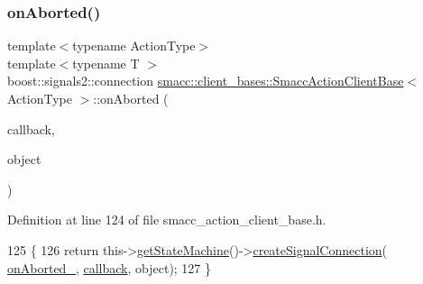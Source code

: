 \subsubsection{\texorpdfstring{on\+Aborted()}{onAborted()}\hspace{0.1cm}{\footnotesize\ttfamily [1/2]}}
{\footnotesize\ttfamily template$<$typename Action\+Type$>$ \\
template$<$typename T $>$ \\
boost\+::signals2\+::connection \hyperlink{classsmacc_1_1client__bases_1_1SmaccActionClientBase}{smacc\+::client\+\_\+bases\+::\+Smacc\+Action\+Client\+Base}$<$ Action\+Type $>$\+::on\+Aborted (\begin{DoxyParamCaption}\item[{void(T\+::$\ast$)(Result\+Const\+Ptr \&)}]{callback,  }\item[{T $\ast$}]{object }\end{DoxyParamCaption})\hspace{0.3cm}{\ttfamily [inline]}}



Definition at line 124 of file smacc\+\_\+action\+\_\+client\+\_\+base.\+h.


\begin{DoxyCode}
125     \{
126         \textcolor{keywordflow}{return} this->\hyperlink{classsmacc_1_1ISmaccClient_aec51d4712404cb9882b86e4c854bb93a}{getStateMachine}()->\hyperlink{classsmacc_1_1ISmaccStateMachine_adf0f42ade0c65cc471960fe2a7c42da2}{createSignalConnection}(
      \hyperlink{classsmacc_1_1client__bases_1_1SmaccActionClientBase_adc33748ca4fcef9730f8039b75d496d0}{onAborted\_}, \hyperlink{servers_2opencv__perception__node_2opencv__perception__node_8cpp_a050e697bd654facce10ea3f6549669b3}{callback}, \textcolor{keywordtype}{object});
127     \}
\end{DoxyCode}
\mbox{\label{classsmacc_1_1client__bases_1_1SmaccActionClientBase_a67661e9415e2f2c2a1fede92a1b3dd1d}} 
